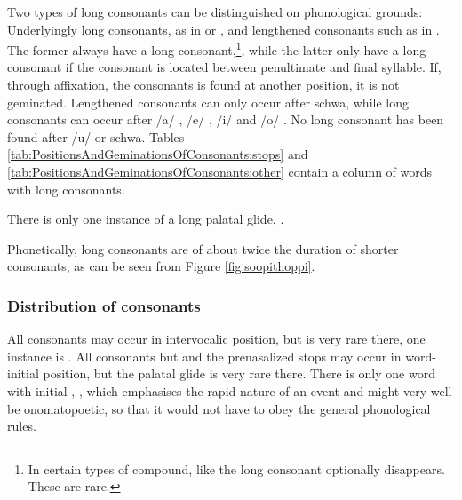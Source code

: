 Two types of long consonants can be distinguished on phonological grounds: Underlyingly long consonants, as in  or , and lengthened consonants such as in . The former  always have a long consonant,\footnote{In certain types of compound, like 
the long consonant optionally disappears. These are rare.}, while the latter only have a long consonant if the consonant is located between penultimate and final syllable. If, through affixation, the consonants is found at another position, it is not geminated. Lengthened consonants can only occur after schwa, while long consonants can occur after /a/ , /e/ , /i/  and  /o/ . No long consonant has been found after /u/ or schwa.
Tables \ref{tab:PositionsAndGeminationsOfConsonants:stops} and \ref{tab:PositionsAndGeminationsOfConsonants:other}  contain a column of words with long consonants.

There is only one instance of a long palatal glide, .

Phonetically, long consonants are of about twice the duration of shorter consonants, as can be seen from Figure \ref{fig:soopithoppi}.

% 


\subsubsection{Distribution of consonants}\label{sec:phon:Distributionofconsonants}
All consonants may occur in intervocalic position, but \dentd{} is very rare there, one instance is .
All consonants but \ng{} and the prenasalized stops may occur in  word-initial position, but the palatal glide is very rare there. There is only one word with initial \tz{}, , which emphasises the rapid nature of an event and might very well be onomatopoetic, so that it would not have to obey the general phonological rules. 

